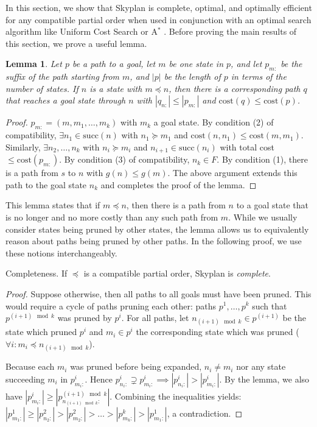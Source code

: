 \documentclass[letterpaper]{article}
\theoremstyle{plain} \newtheorem{theorem}{Theorem} \newtheorem{proposition}{Proposition} \newtheorem{lemma}{Lemma}
\theoremstyle{definition} \newtheorem{definition}{Definition} \newtheorem{conjecture}{Conjecture} \newtheorem*{example}{Example}
\theoremstyle{remark} \newtheorem*{remark}{Remark} \newtheorem*{note}{Note} \newtheorem{case}{Case}
\newcommand{\Astar}{A$^*$ }
\begin{document}
In this section, we show that Skyplan is complete, optimal, and
optimally efficient for any compatible partial order when used in
conjunction with an optimal search algorithm like Uniform Cost
Search or \Astar. Before proving the main results of this section,
we prove a useful lemma.

\begin{lemma}{}\label{clm-complete-lemma}
  Let $p$ be a path to a goal, let $m$ be one state in $p$, and let 
$p_{m:}$ be the suffix of the path starting from $m$, and $|p|$
be
the length of $p$ in terms of the number of states. If $n$ is a state
with $m \preceq n$, then there is a corresponding path $q$ that reaches a goal state
through $n$ with $|q_{n:}| \leq |p_{m:}|$ and $\mathrm{cost}(q) \leq \mathrm{cost}(p)$.
\end{lemma}

\begin{proof}
$p_{m:}=(m,m_{1},\dots,m_{k})$ with $m_{k}$ a goal state.
By condition (2) of compatibility, $\exists n_{1} \in \mathrm{succ}(n)$ 
with $n_{1} \succeq m_{1}$ and $\mathrm{cost}(n,n_{1}) \leq \mathrm{cost}(m,m_{1})$. 
Similarly, $\exists n_{2},\dots,n_{k}$ with 
$n_{i} \succeq m_{i}$ and $n_{i+1} \in \mathrm{succ}(n_{i})$ with 
total cost $\leq \mathrm{cost}(p_{m:})$.
By condition (3) of compatibility, $n_{k} \in F$. By condition (1),
there is a path from $s$ to $n$ with $g(n) \leq g(m)$. The above argument extends this path
to the goal state $n_{k}$ and completes the proof of the lemma.
\end{proof}

This lemma states that if $m \preceq n$, then there is a path from $n$ to a goal
state that is no longer and no more costly than any such path from $m$.
While we usually consider states being pruned by other states, the lemma
allows us to equivalently reason about paths being pruned by other paths.
In the following proof, we use these notions interchangeably.


\begin{claim}{Completeness.}\label{clm-complete}
   If $\preceq$ is a compatible partial order, Skyplan
is \emph{complete}.
\end{claim}
\begin{proof}
Suppose otherwise, then all paths to all goals must
have been pruned. This would require a cycle of paths pruning each other: 
paths $p^{1},\dots,p^{k}$ such that $p^{ (i+1) \mod k}$ was pruned by $p^{i }$.
For all paths, let $n_{(i+1) \mod k} \in p^{(i+1)}$ be the state which pruned $p^{i}$ and
$m_{i} \in p^{i}$ the corresponding state which was pruned 
($\forall i: m_{i} \preceq n_{(i+1) \mod k}$).

Because each $m_{i}$ was pruned before being expanded,
$n_{i} \neq m_{i}$ nor any state succeeding $m_{i}$ in $p^{i}_{m_{i}:}$.
Hence $p^{i}_{n_{i}:} \supsetneq p^{i}_{m_{i}:} \implies |p^{i}_{n_{i}:}| > |p^{i}_{m_{i}:}|$.
By the lemma, we also have %
 $|p^{i}_{m_{i}:}| \geq |p^{(i+1)\mod k}_{n_{(i+1)\mod k}:}|$. Combining the
inequalities yields: $|p^{1}_{m_{1}:}| \geq |p^{2}_{n_{2}:}| > |p^{2}_{m_{2}:}| > \dots > |p^{k}_{m_{k}:}| > |p^{1}_{m_{1}:}|$, 
a contradiction.
\end{proof}
  
\end{document}
